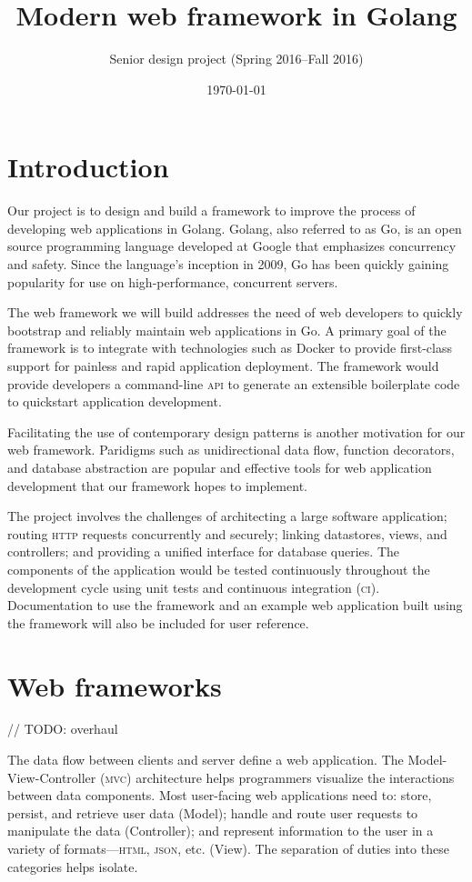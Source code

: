 \documentclass{article}
\title{Modern web framework in Golang}
\author{Senior design project (Spring 2016--Fall 2016)}
\date{\today}
\begin{document}
\maketitle

\section{Introduction}

Our project is to design and build a framework to improve the process of developing web applications in Golang. Golang, also referred to as Go, is an open source programming language developed at Google that emphasizes concurrency and safety. Since the language’s inception in 2009, Go has been quickly gaining popularity for use on high-performance, concurrent servers.

The web framework we will build addresses the need of web developers to quickly bootstrap and reliably maintain web applications in Go. A primary goal of the framework is to integrate with technologies such as Docker to provide first-class support for painless and rapid application deployment. The framework would provide developers a command-line \textsc{api} to generate an extensible boilerplate code to quickstart application development.

Facilitating the use of contemporary design patterns is another motivation for our web framework. Paridigms such as unidirectional data flow, function decorators, and database abstraction are popular and effective tools for web application development that our framework hopes to implement.

The project involves the challenges of architecting a large software application; routing \textsc{http} requests concurrently and securely; linking datastores, views, and controllers; and providing a unified interface for database queries. The components of the application would be tested continuously throughout the development cycle using unit tests and continuous integration (\textsc{ci}). Documentation to use the framework and an example web application built using the framework will also be included for user reference. 

\section{Web frameworks}

// TODO: overhaul

The data flow between clients and server define a web application. The Model-View-Controller (\textsc{mvc}) architecture helps programmers visualize the interactions between data components. Most user-facing web applications need to: store, persist, and retrieve user data (Model); handle and route user requests to manipulate the data (Controller); and represent information to the user in a variety of formats---\textsc{html, json}, etc. (View). The separation of duties into these categories helps isolate.
\end{document}
